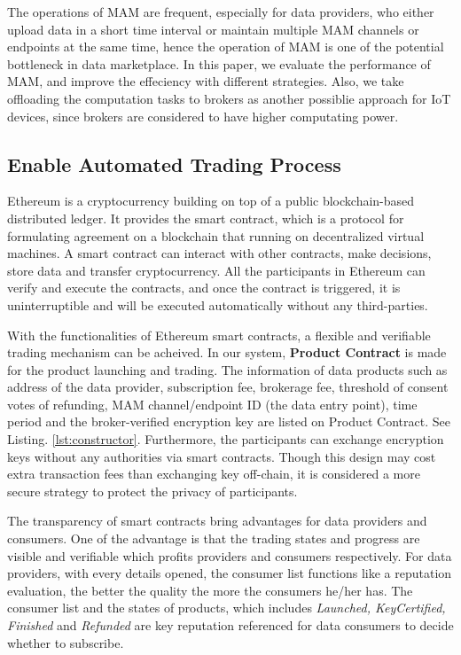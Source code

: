 \documentclass[conference]{IEEEtran}
\begin{document}
The operations of MAM are frequent, especially for data providers, who either upload data in a short time interval or maintain multiple MAM channels or endpoints at the same time, hence the operation of MAM is one of the potential bottleneck in data marketplace. In this paper, we evaluate the performance of MAM, and improve the effeciency with different strategies. Also, we take offloading the computation tasks to brokers as another possiblie approach for IoT devices, since brokers are considered to have higher computating power.


\subsection{Enable Automated Trading Process}
Ethereum is a cryptocurrency building on top of a public blockchain-based distributed ledger. It provides the smart contract, which is a protocol for formulating agreement on a blockchain that running on decentralized virtual machines. A smart contract can interact with other contracts, make decisions, store data and transfer cryptocurrency. All the participants in Ethereum can verify and execute the contracts, and once the contract is triggered, it is uninterruptible and will be executed automatically without any third-parties. 

With the functionalities of Ethereum smart contracts, a flexible and verifiable trading mechanism can be acheived. In our system, \textbf{Product Contract} is made for the product launching and trading. The information of data products such as address of the data provider, subscription fee, brokerage fee, threshold of consent votes of refunding, MAM channel/endpoint ID (the data entry point), time period and the broker-verified encryption key are listed on Product Contract. See Listing. \ref{lst:constructor}. Furthermore, the participants can exchange encryption keys without any authorities via smart contracts. Though this design may cost extra transaction fees than exchanging key off-chain, it is considered a more secure strategy to protect the privacy of participants.

The transparency of smart contracts bring advantages for data providers and consumers. One of the advantage is that the trading states and progress are visible and verifiable which profits providers and consumers respectively. For data providers, with every details opened, the consumer list functions like a reputation evaluation, the better the quality the more the consumers he/her has. The consumer list and the states of products, which includes \textit{Launched, KeyCertified, Finished} and \textit{Refunded} are key reputation referenced for data consumers to decide whether to subscribe. 
\end{document}
